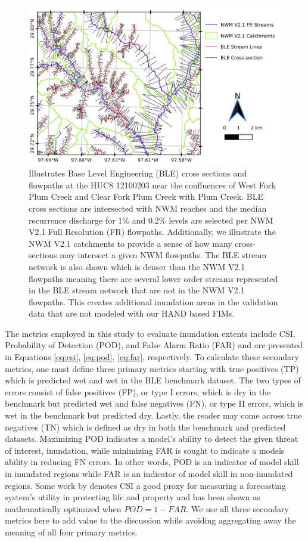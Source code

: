 %
\begin{figure}[H]
\centering
\includegraphics[scale=1.0]{figures/ble_evaluation_method.jpg}
\caption{
Illustrates Base Level Engineering (BLE) cross sections and flowpaths at the HUC8 12100203 near the confluences of West Fork Plum Creek and Clear Fork Plum Creek with Plum Creek.
BLE cross sections are intersected with NWM reaches and the median recurrence discharge for 1\% and 0.2\% levels are selected per NWM V2.1 Full Resolution (FR) flowpaths.
Additionally, we illustrate the NWM V2.1 catchments to provide a sense of how many cross-sections may intersect a given NWM flowpaths.
The BLE stream network is also shown which is denser than the NWM V2.1 flowpaths meaning there are several lower order streams represented in the BLE stream network that are not in the NWM V2.1 flowpaths.
This creates additional inundation areas in the validation data that are not modeled with our HAND based FIMs.
}
\label{fig:ble_evaluation_method}
\end{figure}
%

The metrics employed in this study to evaluate inundation extents include CSI, Probability of Detection (POD), and False Alarm Ratio (FAR) and are presented in Equations \ref{eq:csi}, \ref{eq:pod}, \ref{eq:far}, respectively.
To calculate these secondary metrics, one must define three primary metrics starting with true positives (TP) which is predicted wet and wet in the BLE benchmark dataset.
The two types of errors consist of false positives (FP), or type I errors, which is dry in the benchmark but predicted wet and false negatives (FN), or type II errors, which is wet in the benchmark but predicted dry. 
Lastly, the reader may come across true negatives (TN) which is defined as dry in both the benchmark and predicted datasets.
Maximizing POD indicates a model's ability to detect the given threat of interest, inundation, while minimizing FAR is sought to indicate a models ability in reducing FN errors.
In other words, POD is an indicator of model skill in inundated regions while FAR is an indicator of model skill in non-inundated regions.
Some work by  denotes CSI a good proxy for measuring a forecasting system's utility in protecting life and property and has been shown as mathematically optimized when $POD = 1 - FAR$.
We use all three secondary metrics here to add value to the discussion while avoiding aggregating away the meaning of all four primary metrics.

